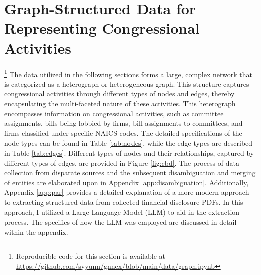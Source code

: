 \documentclass[15pt,letterpaper]{article}
\begin{document}


\section{Graph-Structured Data for Representing Congressional Activities}\label{sec:data} \footnote{Reproducible code for this section is available at \url{https://github.com/syyunn/gnnex/blob/main/data/graph.ipynb}}
The data utilized in the following sections forms a large, complex network that is categorized as a heterograph or heterogeneous graph. This structure captures congressional activities through different types of nodes and edges, thereby encapsulating the multi-faceted nature of these activities. 
This heterograph encompasses information on congressional activities, such as committee assignments, bills being lobbied by firms, bill assignments to committees, and firms classified under specific NAICS codes. The detailed specifications of the node types can be found in Table \ref{tab:nodes}, while the edge types are described in Table \ref{tab:edges}.
Different types of nodes and their relationships, captured by different types of edges, are provided in Figure \ref{fig:cbd}.
The process of data collection from disparate sources and the subsequent disambiguation and merging of entities are elaborated upon in Appendix \ref{app:disambiguation}.
Additionally, Appendix \ref{app:par} provides a detailed explanation of a more modern approach to extracting structured data from collected financial disclosure PDFs. In this approach, I utilized a Large Language Model (LLM) to aid in the extraction process. The specifics of how the LLM was employed are discussed in detail within the appendix.
\end{document}
